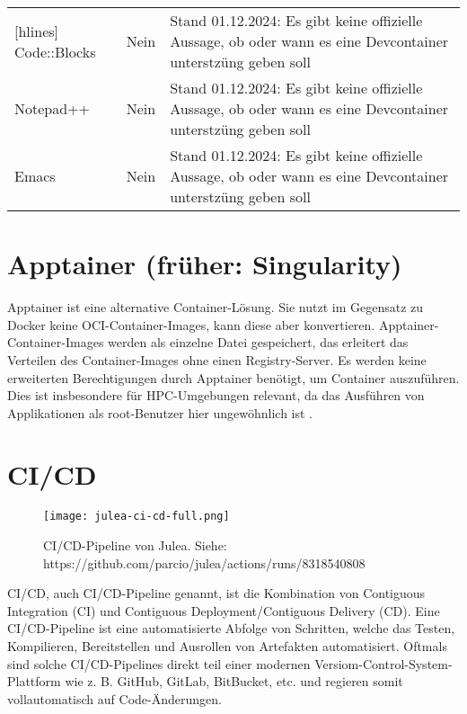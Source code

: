 \begin{table}[H]
\begin{NiceTabular}{X|X|X[4]}[hlines]
        Code::Blocks       & Nein          & Stand 01.12.2024: Es gibt keine offizielle Aussage, ob oder wann es eine Devcontainer unterstzüng geben soll                                                                                                            \\
        Notepad++          & Nein          & Stand 01.12.2024: Es gibt keine offizielle Aussage, ob oder wann es eine Devcontainer unterstzüng geben soll                                                                                                            \\
        Emacs              & Nein          & Stand 01.12.2024: Es gibt keine offizielle Aussage, ob oder wann es eine Devcontainer unterstzüng geben soll                                                                                                            \\
    \end{NiceTabular}
\end{table}

\section{Apptainer (früher: Singularity)}

Apptainer ist eine alternative Container-Lösung. Sie nutzt im Gegensatz zu Docker keine OCI-Container-Images, kann diese aber konvertieren. Apptainer-Container-Images werden als einzelne Datei gespeichert, das erleitert das Verteilen des Container-Images ohne einen Registry-Server. Es werden keine erweiterten Berechtigungen durch Apptainer benötigt, um Container auszuführen. Dies ist insbesondere für HPC-Umgebungen relevant, da das Ausführen von Applikationen als root-Benutzer hier ungewöhnlich ist \cite{apptainerApptainerPortableReproducible}.

\section{CI/CD}

\begin{figure}[H]
    \texttt{[image: julea-ci-cd-full.png]}
    \caption{CI/CD-Pipeline von Julea. \newline
        Siehe: https://github.com/parcio/julea/actions/runs/8318540808}
\end{figure}

CI/CD, auch CI/CD-Pipeline genannt, ist die Kombination von Contiguous Integration (CI) und Contiguous Deployment/Contiguous Delivery (CD). Eine CI/CD-Pipeline ist eine automatisierte Abfolge von Schritten, welche das Testen, Kompilieren, Bereitstellen und Ausrollen von Artefakten automatisiert. Oftmals sind solche CI/CD-Pipelines direkt teil einer modernen Versiom-Control-System-Plattform wie z. B. GitHub, GitLab, BitBucket, etc. und regieren somit vollautomatisch auf Code-Änderungen.

